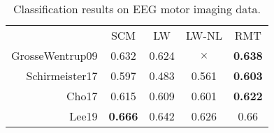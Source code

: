 \documentclass{article}
\theoremstyle{plain}
\theoremstyle{definition}
\theoremstyle{remark}
\begin{document}
\begin{table}
    \centering
    \begin{tabular}{rcccc}
        & SCM & LW & LW-NL & RMT \\
        \cline{2-5}
        GrosseWentrup09 & 0.632 & 0.624 & $\times$ & {\bf 0.638} \\
        Schirmeister17 & 0.597 & 0.483 & 0.561 & {\bf 0.603} \\
        Cho17 & 0.615 & 0.609 & 0.601 & {\bf 0.622} \\
        Lee19 & {\bf 0.666} & 0.642 & 0.626 & 0.66 \\
    \end{tabular}
    \caption{Classification results on EEG motor imaging data.}
    \label{tab:eeg_mi}
\end{table}
\end{document}
